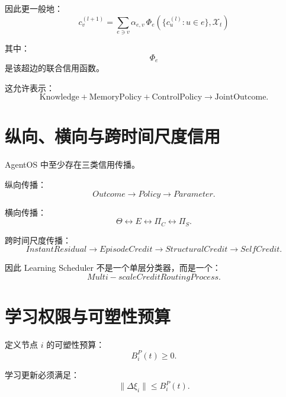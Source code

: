 因此更一般地：
\begin{equation}
\boxed{
c_v^{(l+1)}
=
\sum_{e\ni v}
\alpha_{e,v}
\,
\Phi_e
\left(
\{c_u^{(l)}:u\in e\},
\mathcal{X}_t
\right)
}
\end{equation}

其中：
\begin{equation}
\Phi_e
\end{equation}
是该超边的联合信用函数。

这允许表示：
\begin{equation}
\text{Knowledge}
+
\text{MemoryPolicy}
+
\text{ControlPolicy}
\rightarrow
\text{JointOutcome}.
\end{equation}


\section{纵向、横向与跨时间尺度信用}

AgentOS 中至少存在三类信用传播。

纵向传播：
\begin{equation}
Outcome
\rightarrow
Policy
\rightarrow
Parameter.
\end{equation}

横向传播：
\begin{equation}
\Theta
\leftrightarrow
E
\leftrightarrow
\Pi_C
\leftrightarrow
\Pi_S.
\end{equation}

跨时间尺度传播：
\begin{equation}
\boxed{
InstantResidual
\rightarrow
EpisodeCredit
\rightarrow
StructuralCredit
\rightarrow
SelfCredit.
}
\end{equation}

因此 Learning Scheduler 不是一个单层分类器，而是一个：
\begin{equation}
\boxed{
Multi-scale Credit Routing Process.
}
\end{equation}


\section{学习权限与可塑性预算}

定义节点 $i$ 的可塑性预算：
\begin{equation}
B_i^P(t)\geq0.
\end{equation}

学习更新必须满足：
\begin{equation}
\boxed{
\|\Delta\xi_i\|
\leq
B_i^P(t).
}
\end{equation}

